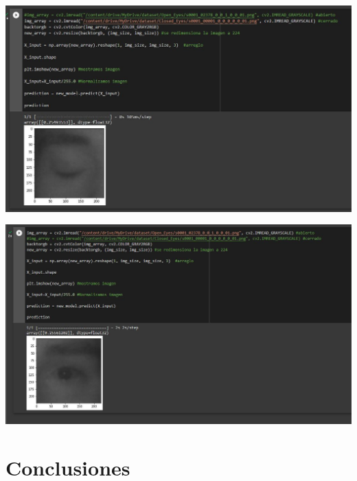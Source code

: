 \documentclass[12pt,letterpaper]{article}
\begin{document}
\begin{center}
  \includegraphics[scale=0.4]{imagenes/ojo_cerradoMN.JPG}
 \label{fig:Prueba3} 
\end{center} 

\begin{center}
  \includegraphics[scale=0.4]{imagenes/ojo_abiertoMN.JPG}
 \label{fig:Prueba4} 
\end{center} 

\newpage
\section{Conclusiones}
\end{document}

